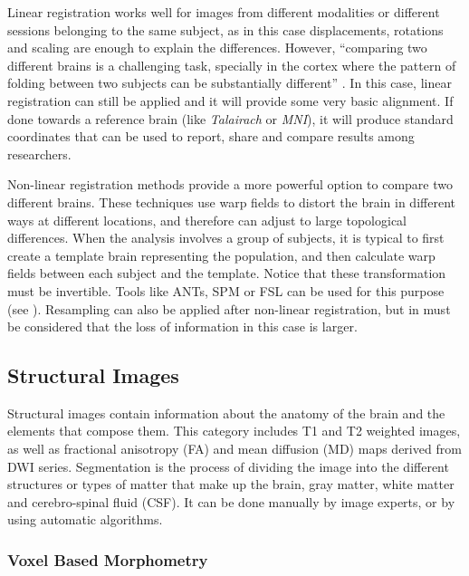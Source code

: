 Linear registration works well for images from different modalities or different sessions belonging to the same subject, as in this case displacements, rotations and scaling are enough to explain the differences. However, ``comparing two different brains is a challenging task, specially in the cortex where the pattern of folding between two subjects can be substantially different'' \autocite{toga_new_2002}. In this case, linear registration can still be applied and it will provide some very basic alignment. If done towards a reference brain (like \emph{Talairach} or \emph{MNI}), it will produce standard coordinates that can be used to report, share and compare results among researchers.

Non-linear registration methods provide a more powerful option to compare two different brains. These techniques use warp fields to distort the brain in different ways at different locations, and therefore can adjust to large topological differences. When the analysis involves a group of subjects, it is typical to first create a template brain representing the population, and then calculate warp fields between each subject and the template. Notice that these transformation must be invertible. Tools like ANTs, SPM or FSL can be used for this purpose (see \autocite{klein_evaluation_2009,klein_evaluation_2010}). Resampling can also be applied after non-linear registration, but in must be considered that the loss of information in this case is larger.
 
\subsection{Structural Images}

Structural images contain information about the anatomy of the brain and the elements that compose them. This category includes T1 and T2 weighted images, as well as fractional anisotropy (FA) and mean diffusion (MD) maps derived from DWI series. Segmentation is the process of dividing the image into the different structures or types of matter that make up the brain, gray matter, white matter and cerebro-spinal fluid (CSF). It can be done manually by image experts, or by using automatic algorithms. 


\subsubsection{Voxel Based Morphometry}

